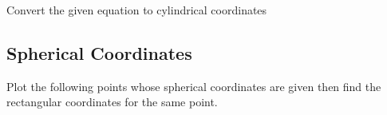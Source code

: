 \documentclass[12pt]{exam}
\begin{document}
\begin{questions}
\question Convert the given equation to cylindrical coordinates


\subsection*{Spherical Coordinates}

\question Plot the following points whose spherical coordinates are given then find the rectangular coordinates for the same point.


\end{questions}
\end{document}
